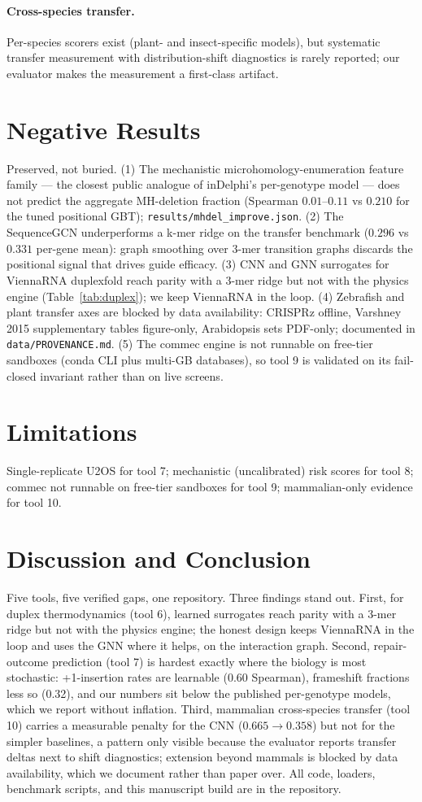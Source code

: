 \documentclass[12pt]{article}
\begin{document}
\paragraph{Cross-species transfer.} Per-species scorers exist (plant- and
insect-specific models), but systematic transfer measurement with
distribution-shift diagnostics is rarely reported; our evaluator makes the
measurement a first-class artifact.


\section{Negative Results}
Preserved, not buried. (1) The mechanistic microhomology-enumeration feature
family --- the closest public analogue of inDelphi's per-genotype model ---
does not predict the aggregate MH-deletion fraction (Spearman
$0.01$--$0.11$ vs $0.210$ for the tuned positional GBT);
\texttt{results/mhdel\_improve.json}. (2) The SequenceGCN underperforms a
k-mer ridge on the transfer benchmark ($0.296$ vs $0.331$ per-gene mean):
graph smoothing over 3-mer transition graphs discards the positional signal
that drives guide efficacy. (3) CNN and GNN surrogates for ViennaRNA
duplexfold reach parity with a 3-mer ridge but not with the physics engine
(Table~\ref{tab:duplex}); we keep ViennaRNA in the loop. (4) Zebrafish and
plant transfer axes are blocked by data availability: CRISPRz offline,
Varshney 2015 supplementary tables figure-only, Arabidopsis sets PDF-only;
documented in \texttt{data/PROVENANCE.md}. (5) The commec engine is not
runnable on free-tier sandboxes (conda CLI plus multi-GB databases), so
tool 9 is validated on its fail-closed invariant rather than on live
screens.

\section{Limitations}
Single-replicate U2OS for tool 7; mechanistic (uncalibrated) risk scores for
tool 8; commec not runnable on free-tier sandboxes for tool 9; mammalian-only
evidence for tool 10.
\section{Discussion and Conclusion}
Five tools, five verified gaps, one repository. Three findings stand out.
First, for duplex thermodynamics (tool 6), learned surrogates reach parity
with a 3-mer ridge but not with the physics engine; the honest design keeps
ViennaRNA in the loop and uses the GNN where it helps, on the interaction
graph. Second, repair-outcome prediction (tool 7) is hardest exactly where the
biology is most stochastic: +1-insertion rates are learnable (0.60 Spearman),
frameshift fractions less so (0.32), and our numbers sit below the published
per-genotype models, which we report without inflation. Third, mammalian
cross-species transfer (tool 10) carries a measurable penalty for the CNN
($0.665 \to 0.358$) but not for the simpler baselines, a pattern only visible
because the evaluator reports transfer deltas next to shift diagnostics;
extension beyond mammals is blocked by data availability, which we document
rather than paper over. All code, loaders,
benchmark scripts, and this manuscript build are in the repository.
\appendix
\end{document}
